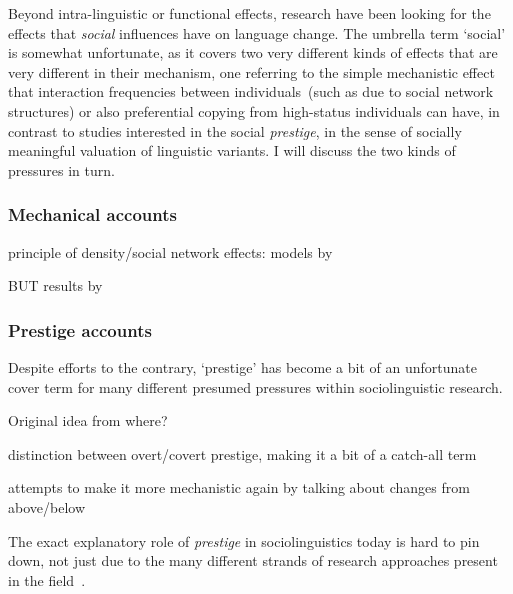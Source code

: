 Beyond intra-linguistic or functional effects, research have been looking for the effects that \emph{social} influences have on language change. The umbrella term `social' is somewhat unfortunate, as it covers two very different kinds of effects that are very different in their mechanism, one referring to the simple mechanistic effect that interaction frequencies between individuals~(such as due to social network structures) or also preferential copying from high-status individuals can have, in contrast to studies interested in the social \emph{prestige}, in the sense of socially meaningful valuation of linguistic variants. I will discuss the two kinds of pressures in turn.

\subsubsection{Mechanical accounts}

principle of density/social network effects: models by \citep{Nettle1999,Silva2008,Gong2012,Pierrehumbert2014}

BUT results by \citep[was it that? Northern cities stuff]{Labov2001}


\subsubsection{Prestige accounts}

Despite efforts to the contrary, `prestige' has become a bit of an unfortunate cover term for many different presumed pressures within sociolinguistic research. 

Original idea from where?

distinction between overt/covert prestige, making it a bit of a catch-all term

attempts to make it more mechanistic again by talking about changes from above/below

The exact explanatory role of \emph{prestige} in sociolinguistics today is hard to pin down, not just due to the many different strands of research approaches present in the field~\citep{Tagliamonte2015}.

